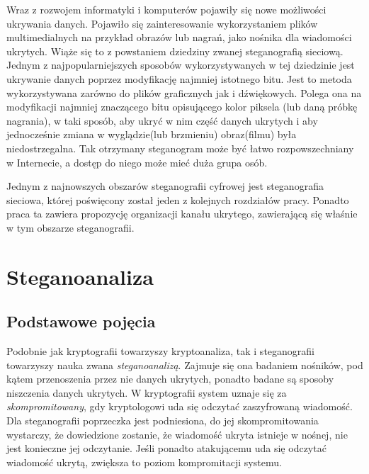 \documentclass[a4paper, twoside]{report}
\begin{document}
        Wraz z rozwojem informatyki i komputerów pojawiły się nowe możliwości
        ukrywania danych. Pojawiło się zainteresowanie wykorzystaniem plików
        multimedialnych na przykład obrazów lub nagrań, jako nośnika dla wiadomości
        ukrytych. Wiąże się to z powstaniem dziedziny zwanej steganografią sieciową.
        Jednym z najpopularniejszych sposobów wykorzystywanych w tej dziedzinie
        jest ukrywanie danych poprzez modyfikację najmniej istotnego bitu. Jest
        to metoda wykorzystywana zarówno do plików graficznych\cite{LSBSTEGANGRAPHY}
        jak i dźwiękowych\cite{AUDIOLSBSTEGANGRAPHY}.
        Polega ona na modyfikacji najmniej znaczącego bitu opisującego kolor piksela
        (lub daną próbkę nagrania), w taki sposób, aby ukryć w nim część danych
        ukrytych i aby jednocześnie zmiana w wyglądzie(lub brzmieniu) obraz(filmu)
        była niedostrzegalna. Tak otrzymany steganogram może być łatwo rozpowszechniany
        w Internecie, a dostęp do niego może mieć duża grupa osób.

        Jednym z najnowszych obszarów steganografii cyfrowej jest steganografia
        sieciowa, której poświęcony został jeden z kolejnych rozdziałów pracy.
        Ponadto praca ta zawiera propozycję organizacji kanału ukrytego, zawierającą
        się właśnie w tym obszarze steganografii.

    \section{Steganoanaliza}
        \subsection{Podstawowe pojęcia}
        Podobnie jak kryptografii towarzyszy kryptoanaliza, tak i steganografii
        towarzyszy nauka zwana \emph{steganoanalizą}. Zajmuje się ona badaniem
        nośników, pod kątem przenoszenia przez nie danych ukrytych, ponadto badane
        są sposoby niszczenia danych ukrytych. W kryptografii system uznaje się
        za \emph{skompromitowany}, gdy kryptologowi uda się odczytać zaszyfrowaną wiadomość.
        Dla steganografii poprzeczka jest podniesiona, do jej skompromitowania wystarczy,
        że dowiedzione zostanie, że wiadomość ukryta istnieje w nośnej, nie jest
        konieczne jej odczytanie. Jeśli ponadto atakującemu uda się odczytać wiadomość
        ukrytą, zwiększa to poziom kompromitacji systemu.
\end{document}
